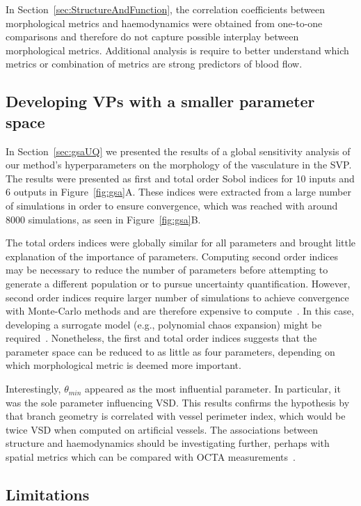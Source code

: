 \documentclass[11pt,]{article}
\begin{document}
In Section~\ref{sec:StructureAndFunction}, the correlation coefficients between morphological metrics and haemodynamics were obtained from one-to-one comparisons and therefore do not capture possible interplay between morphological metrics.
Additional analysis is require to better understand which metrics or combination of metrics are strong predictors of blood flow.

\subsection{Developing VPs with a smaller parameter space}\label{sec:disc-gsa}

In Section~\ref{sec:gsaUQ} we presented the results of a global sensitivity analysis of our method's hyperparameters on the morphology of the vasculature in the SVP.
The results were presented as first and total order Sobol indices for 10 inputs and 6 outputs in Figure~\ref{fig:gsa}A.
These indices were extracted from a large number of simulations in order to ensure convergence, which was reached with around \SI{8000}{} simulations, as seen in Figure~\ref{fig:gsa}B.

The total orders indices were globally similar for all parameters and brought little explanation of the importance of parameters.
Computing second order indices may be necessary to reduce the number of parameters before attempting to generate a different population or to pursue uncertainty quantification.
However, second order indices require larger number of simulations to achieve convergence with Monte-Carlo methods and are therefore expensive to compute~\cite{Saltelli2008}.
In this case, developing a surrogate model (e.g., polynomial chaos expansion) might be required~\cite{Saltelli2008}.
Nonetheless, the first and total order indices suggests that the parameter space can be reduced to as little as four parameters, depending on which morphological metric is deemed more important.

Interestingly, $\theta_{min}$ appeared as the most influential parameter.
In particular, it was the sole parameter influencing VSD.
This results confirms the hypothesis by \cite{Yao_2020} that branch geometry is correlated with vessel perimeter index, which would be twice VSD when computed on artificial vessels.
The associations between structure and haemodynamics should be investigating further, perhaps with spatial metrics which can be compared with OCTA measurements~\cite{Yao_2020}.

\subsection{Limitations}\label{sec:disc-limitations}
\end{document}
